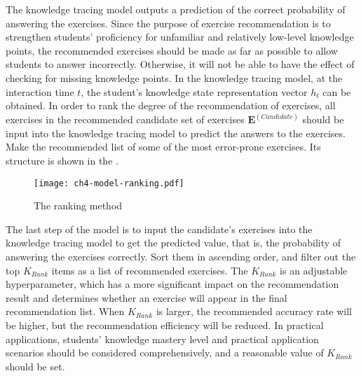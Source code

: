 The knowledge tracing model outputs a prediction of the correct probability of answering the exercises. Since the purpose of exercise recommendation is to strengthen students' proficiency for unfamiliar and relatively low-level knowledge points, the recommended exercises should be made as far as possible to allow students to answer incorrectly. Otherwise, it will not be able to have the effect of checking for missing knowledge points. In the knowledge tracing model, at the interaction time \(t\), the student's knowledge state representation vector \(h_t\) can be obtained. In order to rank the degree of the recommendation of exercises, all exercises in the recommended candidate set of exercises \(\mathbf{E}^{(Candidate)}\) should be input into the knowledge tracing model to predict the answers to the exercises. Make the recommended list of some of the most error-prone exercises. Its structure is shown in the \figname{\ref{fig:ch4-model-ranking}}.

\begin{figure}[htbp!]
    \centering
    \texttt{[image: ch4-model-ranking.pdf]}
    \caption{The ranking method}\label{fig:ch4-model-ranking}
\end{figure}


The last step of the model is to input the candidate's exercises into the knowledge tracing model to get the predicted value, that is, the probability of answering the exercises correctly. Sort them in ascending order, and filter out the top \(K_{Rank}\) items as a list of recommended exercises. The \(K_{Rank}\) is an adjustable hyperparameter, which has a more significant impact on the recommendation result and determines whether an exercise will appear in the final recommendation list. When \(K_{Rank}\) is larger, the recommended accuracy rate will be higher, but the recommendation efficiency will be reduced. In practical applications, students' knowledge mastery level and practical application scenarios should be considered comprehensively, and a reasonable value of \(K_{Rank}\) should be set.

